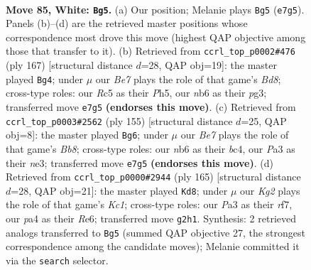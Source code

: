 \documentclass[11pt]{article}
\begin{document}
\clearpage

\begin{figure}[p]\centering
\begin{subfigure}{0.46\textwidth}\centering
\resizebox{\linewidth}{!}{%
\newchessgame
\chessboard[
  setfen={6k1/3rB3/1n6/2R5/p4P2/P6P/6K1/8 w - - 25 85},
  showmover=false,
  pgfstyle=straightmove, color=movearrow, markmove={e7-g5}
]}
\caption{}
\end{subfigure}\hfill
\begin{subfigure}{0.46\textwidth}\centering
\resizebox{\linewidth}{!}{%
\newchessgame
\chessboard[
  setfen={5k2/8/5p2/6pp/8/6P1/8/2Rb2K1 b - - 3 84},
  showmover=false,
  pgfstyle=straightmove, color=movearrow, markmove={d1-g4}
]}
\caption{}
\end{subfigure}
\\[4pt]
\begin{subfigure}{0.46\textwidth}\centering
\resizebox{\linewidth}{!}{%
\newchessgame
\chessboard[
  setfen={8/8/5r1k/1R4pp/2B5/4N3/6PK/1b6 b - - 9 78},
  showmover=false,
  pgfstyle=straightmove, color=movearrow, markmove={b1-g6}
]}
\caption{}
\end{subfigure}\hfill
\begin{subfigure}{0.46\textwidth}\centering
\resizebox{\linewidth}{!}{%
\newchessgame
\chessboard[
  setfen={2k5/5R2/4r3/8/2K4p/6bP/5N2/8 b - - 12 83},
  showmover=false,
  pgfstyle=straightmove, color=movearrow, markmove={c8-d8}
]}
\caption{}
\end{subfigure}
\caption{\textbf{Move 85, White: \texttt{Bg5}.} (a) Our position; Melanie plays \texttt{Bg5} (\texttt{e7g5}). Panels (b)--(d) are the retrieved master positions whose correspondence most drove this move (highest QAP objective among those that transfer to it). (b) Retrieved from \texttt{ccrl\_top\_p0002\#476} (ply 167) [structural distance $d$=28, QAP obj=19]: the master played \texttt{Bg4}; under $\mu$ our \emph{Be7} plays the role of that game's \emph{Bd8}; cross-type roles: our \emph{R}c5 as their \emph{P}h5, our \emph{n}b6 as their \emph{p}g3; transferred move \texttt{e7g5} \textbf{(endorses this move)}. (c) Retrieved from \texttt{ccrl\_top\_p0003\#2562} (ply 155) [structural distance $d$=25, QAP obj=8]: the master played \texttt{Bg6}; under $\mu$ our \emph{Be7} plays the role of that game's \emph{Bb8}; cross-type roles: our \emph{n}b6 as their \emph{b}c4, our \emph{P}a3 as their \emph{n}e3; transferred move \texttt{e7g5} \textbf{(endorses this move)}. (d) Retrieved from \texttt{ccrl\_top\_p0000\#2944} (ply 165) [structural distance $d$=28, QAP obj=21]: the master played \texttt{Kd8}; under $\mu$ our \emph{Kg2} plays the role of that game's \emph{Kc1}; cross-type roles: our \emph{P}a3 as their \emph{r}f7, our \emph{p}a4 as their \emph{R}e6; transferred move \texttt{g2h1}. Synthesis: 2 retrieved analogs transferred to \texttt{Bg5} (summed QAP objective 27, the strongest correspondence among the candidate moves); Melanie committed it via the \texttt{search} selector.}
\label{fig:thought-m168}
\end{figure}
\end{document}

